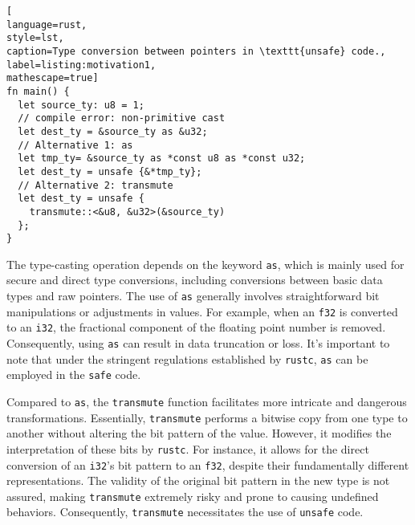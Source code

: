 \begin{lstlisting}[
language=rust, 
style=lst,
caption=Type conversion between pointers in \texttt{unsafe} code.,
label=listing:motivation1,
mathescape=true]
fn main() {
  let source_ty: u8 = 1;
  // compile error: non-primitive cast
  let dest_ty = &source_ty as &u32;  
  // Alternative 1: as
  let tmp_ty= &source_ty as *const u8 as *const u32;
  let dest_ty = unsafe {&*tmp_ty};
  // Alternative 2: transmute
  let dest_ty = unsafe { 
    transmute::<&u8, &u32>(&source_ty) 
  };
}
\end{lstlisting}

\vspace{0.05in}
The type-casting operation depends on the keyword \texttt{as}, which is mainly used for secure and direct type conversions, including conversions between basic data types and raw pointers. The use of \texttt{as} generally involves straightforward bit manipulations or adjustments in values. For example, when an \texttt{f32} is converted to an \texttt{i32}, the fractional component of the floating point number is removed. Consequently, using \texttt{as} can result in data truncation or loss. It's important to note that under the stringent regulations established by \texttt{rustc}, \texttt{as} can be employed in the {\tt safe} code.

\vspace{0.05in}
Compared to \texttt{as}, the \texttt{transmute} function facilitates more intricate and dangerous transformations. Essentially, \texttt{transmute} performs a bitwise copy from one type to another without altering the bit pattern of the value. However, it modifies the interpretation of these bits by \texttt{rustc}. For instance, it allows for the direct conversion of an \texttt{i32}'s bit pattern to an \texttt{f32}, despite their fundamentally different representations. The validity of the original bit pattern in the new type is not assured, making \texttt{transmute} extremely risky and prone to causing undefined behaviors. Consequently, \texttt{transmute} necessitates the use of \texttt{unsafe} code.

